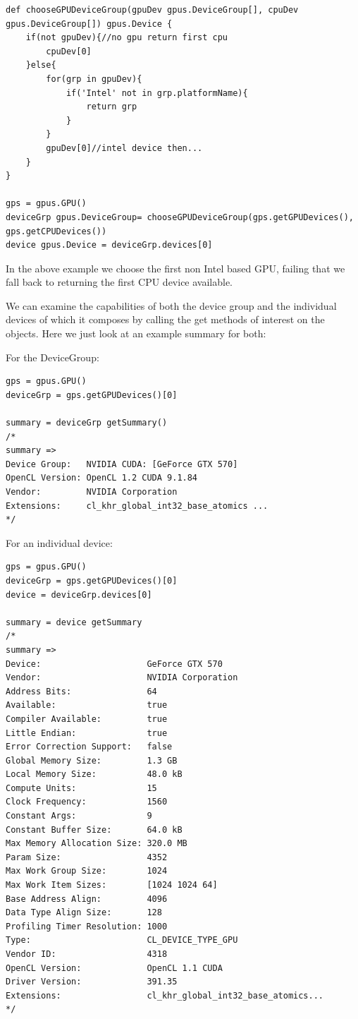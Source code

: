 \documentclass[conc-doc]{subfiles}
\begin{document}
\begin{lstlisting}
def chooseGPUDeviceGroup(gpuDev gpus.DeviceGroup[], cpuDev gpus.DeviceGroup[]) gpus.Device {
	if(not gpuDev){//no gpu return first cpu
		cpuDev[0]
	}else{
		for(grp in gpuDev){
			if('Intel' not in grp.platformName){
				return grp
			}
		}
		gpuDev[0]//intel device then...
	}
}

gps = gpus.GPU()
deviceGrp gpus.DeviceGroup= chooseGPUDeviceGroup(gps.getGPUDevices(), gps.getCPUDevices())
device gpus.Device = deviceGrp.devices[0]
\end{lstlisting}

In the above example we choose the first non Intel based GPU, failing that we fall back to returning the first CPU device available.

We can examine the capabilities of both the device group and the individual devices of which it composes by calling the get methods of interest on the objects. Here we just look at an example summary for both:

For the DeviceGroup:
\begin{lstlisting}
gps = gpus.GPU()
deviceGrp = gps.getGPUDevices()[0]

summary = deviceGrp getSummary()
/*
summary => 
Device Group:   NVIDIA CUDA: [GeForce GTX 570]
OpenCL Version: OpenCL 1.2 CUDA 9.1.84
Vendor:         NVIDIA Corporation
Extensions:     cl_khr_global_int32_base_atomics ...
*/
\end{lstlisting}

For an individual device:
\begin{lstlisting}
gps = gpus.GPU()
deviceGrp = gps.getGPUDevices()[0]
device = deviceGrp.devices[0]

summary = device getSummary
/*
summary => 
Device:                     GeForce GTX 570
Vendor:                     NVIDIA Corporation
Address Bits:               64
Available:                  true
Compiler Available:         true
Little Endian:              true
Error Correction Support:   false
Global Memory Size:         1.3 GB
Local Memory Size:          48.0 kB
Compute Units:              15
Clock Frequency:            1560
Constant Args:              9
Constant Buffer Size:       64.0 kB
Max Memory Allocation Size: 320.0 MB
Param Size:                 4352
Max Work Group Size:        1024
Max Work Item Sizes:        [1024 1024 64]
Base Address Align:         4096
Data Type Align Size:       128
Profiling Timer Resolution: 1000
Type:                       CL_DEVICE_TYPE_GPU
Vendor ID:                  4318
OpenCL Version:             OpenCL 1.1 CUDA
Driver Version:             391.35
Extensions:                 cl_khr_global_int32_base_atomics...
*/
\end{lstlisting}
\end{document}
